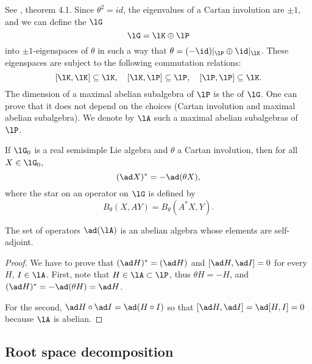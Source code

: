 See \cite{Helgason}, theorem 4.1.  Since $\theta^2=id$, the eigenvalues of a Cartan involution are $\pm 1$, and we can define the  $\lG$
\begin{equation}
	\lG=\lK\oplus\lP
\end{equation}
into $\pm1$-eigenspaces of $\theta$ in such a way that $\theta=(-\id)|_{\lP}\oplus \id|_{\lK}$. These eigenspaces are subject to the following commutation relations:
\begin{equation} \label{Ieq:comm_KP}
	[\lK,\lK]\subseteq\lK,\quad[\lK,\lP]\subseteq\lP,\quad [\lP,\lP]\subseteq\lK.
\end{equation}
%
The dimension of a maximal abelian subalgebra of $\lP$ is the  of $\lG$. One can prove that it does not depend on the choices (Cartan involution and maximal abelian subalgebra). We denote by $\lA$ such a maximal abelian subalgebras of $\lP$.


\begin{lemma}
	If $\lG_0$ is a real semisimple Lie algebra and $\theta$ a Cartan involution, then for all $X\in\lG_0$,
	\begin{equation}
		(\ad X)^*=-\ad(\theta X),
	\end{equation}
	where the star on an operator on $\lG$ is defined by
	\begin{equation}
		B_{\theta}(X,AY)=B_{\theta}(A^*X,Y).
	\end{equation}
\end{lemma}

\begin{lemma}
	The set of operators $\ad(\lA)$ is an abelian algebra whose elements are self-adjoint.
\end{lemma}

\begin{proof}
	We have to prove that $(\ad H)^*=(\ad H)$ and $[\ad H,\ad I]=0$ for every $H$, $I\in \lA$.  First, note that $H\in\lA\subset\lP$, thus $\theta H=-H$, and $(\ad H)^*=-\ad(\theta H)=\ad H$.

	For the second, $\ad H\circ \ad I=\ad(H\circ I)$ so that $[\ad H,\ad I]=\ad[H,I]=0$ because $\lA$ is abelian.
\end{proof}

\subsection{Root space decomposition}

